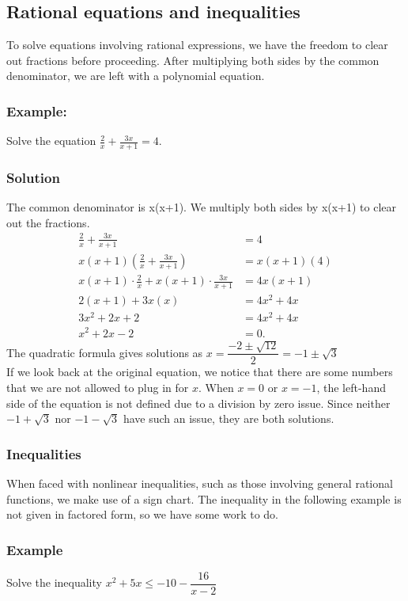 \documentclass{article}
\begin{document}
\subsection{Rational equations and inequalities}
To solve equations involving rational expressions, we have the freedom to clear out fractions before proceeding. After multiplying both sides by the common denominator, we are left with a polynomial equation.

\subsubsection*{Example:}
Solve the equation $\frac {2}{x} + \frac {3x}{x+1} = 4.$
\subsubsection*{Solution }
The common denominator is x(x+1). We multiply both sides by x(x+1)
 to clear out the fractions.
\begin{align*} 
      \frac{2}{x} + \frac{3x}{x+1} &= 4  \\
      x(x+1) \left( \frac{2}{x} + \frac{3x}{x+1} \right) &= x(x+1) ( 4 )\\
      x(x+1) \cdot \frac{2}{x}  + x(x+1) \cdot \frac{3x}{x+1} &= 4x(x+1)\\
      2(x+1) + 3x(x) &= 4x^2 + 4x\\
      3x^2 + 2x + 2 &= 4x^2 + 4x\\
      x^2 + 2x - 2 &= 0.
    \end{align*}
The quadratic formula gives solutions as $\displaystyle x = \dfrac {-2 \pm \sqrt {12}}{2} = -1 \pm \sqrt {3}$\\

If we look back at the original equation, we notice that there are some numbers that we are not allowed to plug in for \(x\). When \(x=0\) or \(x=-1\), the left-hand side of the equation is not defined due to a division by zero issue. Since neither \(-1 + \sqrt{3}\) nor \(-1 - \sqrt{3}\) have such an issue, they are both solutions.
\subsubsection{Inequalities}
When faced with nonlinear inequalities, such as those involving general rational functions, we make use of a sign chart. The inequality in the following example is not given in factored form, so we have some work to do.

\subsubsection*{Example}
Solve the inequality $\displaystyle x^2 + 5x \leq -10 -\dfrac {16}{x-2}$
\end{document}
